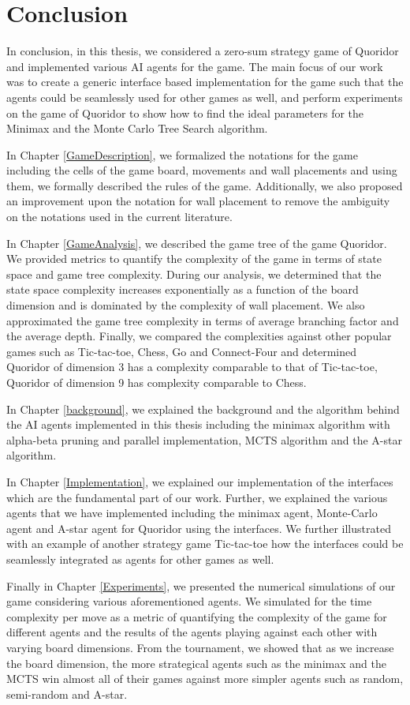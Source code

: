 \chapter{Conclusion}\label{Conclusion}

In conclusion, in this thesis, we considered a zero-sum strategy game of Quoridor and implemented various AI agents for the game. The main focus of our work was to create a generic interface based implementation for the game such that the agents could be seamlessly used for other games as well, and perform experiments on the game of Quoridor to show how to find the ideal parameters for the Minimax and the Monte Carlo Tree Search algorithm.

In Chapter \ref{GameDescription}, we formalized the notations for the game including the cells of the game board, movements and wall placements and using them, we formally described the rules of the game. Additionally, we also proposed an improvement upon the notation for wall placement to remove the ambiguity on the notations used in the current literature.

In Chapter \ref{GameAnalysis}, we described the game tree of the game Quoridor. We provided metrics to quantify the complexity of the game in terms of state space and game tree complexity. During our analysis, we determined that the state space complexity increases exponentially as a function of the board dimension and is dominated by the complexity of wall placement. We also approximated the game tree complexity in terms of average branching factor and the average depth. Finally, we compared the complexities against other popular games such as Tic-tac-toe, Chess, Go and Connect-Four and determined Quoridor of dimension 3 has a complexity comparable to that of Tic-tac-toe, Quoridor of dimension 9 has complexity comparable to Chess.

In Chapter \ref{background}, we explained the background and the algorithm behind the AI agents implemented in this thesis including the minimax algorithm with alpha-beta pruning and parallel implementation, \gls{MCTS} algorithm and the A-star algorithm.

In Chapter \ref{Implementation}, we explained our implementation of the interfaces which are the fundamental part of our work. Further, we explained the various agents that we have implemented including the minimax agent, Monte-Carlo agent and A-star agent for Quoridor using the interfaces. We further illustrated with an example of another strategy game Tic-tac-toe how the interfaces could be seamlessly integrated as agents for other games as well. 

Finally in Chapter \ref{Experiments}, we presented the numerical simulations of our game considering various aforementioned agents. We simulated for the time complexity per move as a metric of quantifying the complexity of the game for different agents and the results of the agents playing against each other with varying board dimensions. From the tournament, we showed that as we increase the board dimension, the more strategical agents such as the minimax and the MCTS win almost all of their games against more simpler agents such as random, semi-random and A-star.